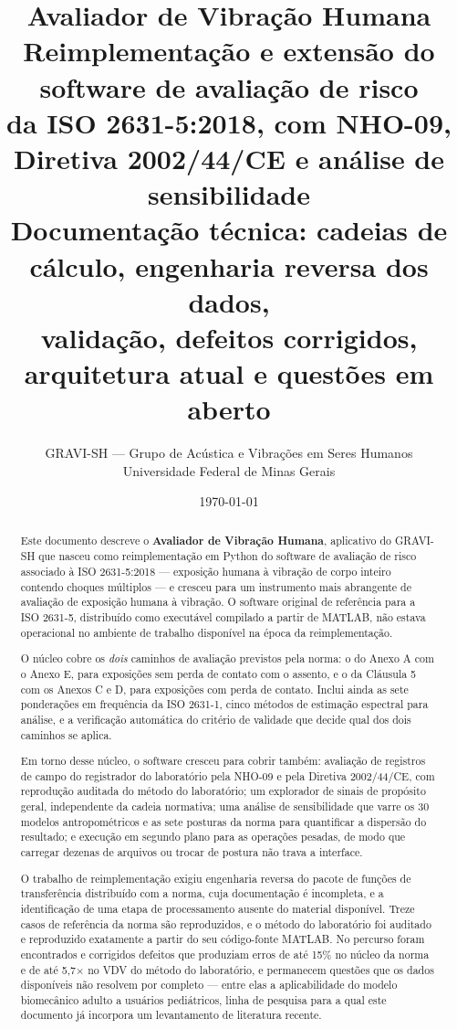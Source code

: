 \documentclass[11pt,a4paper]{article}
\title{\textbf{Avaliador de Vibração Humana}\\[0.3em]
\large Reimplementação e extensão do software de avaliação de risco\\
da ISO 2631-5:2018, com NHO-09, Diretiva 2002/44/CE e análise de sensibilidade\\[0.5em]
\normalsize Documentação técnica: cadeias de cálculo, engenharia reversa
dos dados,\\ validação, defeitos corrigidos, arquitetura atual e questões em aberto}
\author{GRAVI-SH --- Grupo de Acústica e Vibrações em Seres Humanos\\
Universidade Federal de Minas Gerais}
\date{\today}
\begin{document}
\maketitle

\begin{abstract}
\noindent
Este documento descreve o \textbf{Avaliador de Vibração Humana}, aplicativo do
GRAVI-SH que nasceu como reimplementação em Python do software de avaliação de
risco associado à ISO 2631-5:2018 --- exposição humana à vibração de corpo
inteiro contendo choques múltiplos --- e cresceu para um instrumento mais
abrangente de avaliação de exposição humana à vibração. O software original de
referência para a ISO 2631-5, distribuído como executável compilado a partir de
MATLAB, não estava operacional no ambiente de trabalho disponível na época da
reimplementação.

O núcleo cobre os \emph{dois} caminhos de avaliação previstos pela norma: o do
Anexo A com o Anexo E, para exposições sem perda de contato com o assento, e o
da Cláusula 5 com os Anexos C e D, para exposições com perda de contato. Inclui
ainda as sete ponderações em frequência da ISO 2631-1, cinco métodos de
estimação espectral para análise, e a verificação automática do critério de
validade que decide qual dos dois caminhos se aplica.

Em torno desse núcleo, o software cresceu para cobrir também: avaliação de
registros de campo do registrador do laboratório pela NHO-09 e pela Diretiva
2002/44/CE, com reprodução auditada do método do laboratório; um explorador de
sinais de propósito geral, independente da cadeia normativa; uma análise de
sensibilidade que varre os 30 modelos antropométricos e as sete posturas da
norma para quantificar a dispersão do resultado; e execução em segundo plano
para as operações pesadas, de modo que carregar dezenas de arquivos ou trocar de
postura não trava a interface.

O trabalho de reimplementação exigiu engenharia reversa do pacote de funções de
transferência distribuído com a norma, cuja documentação é incompleta, e a
identificação de uma etapa de processamento ausente do material disponível.
Treze casos de referência da norma são reproduzidos, e o método do laboratório
foi auditado e reproduzido exatamente a partir do seu código-fonte MATLAB. No
percurso foram encontrados e corrigidos defeitos que produziam erros de até
15\% no núcleo da norma e de até 5,7$\times$ no VDV do método do laboratório, e
permanecem questões que os dados disponíveis não resolvem por completo --- entre
elas a aplicabilidade do modelo biomecânico adulto a usuários pediátricos,
linha de pesquisa para a qual este documento já incorpora um levantamento de
literatura recente.
\end{abstract}
\end{document}

